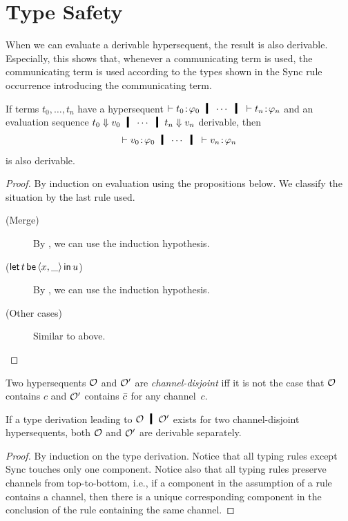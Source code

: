 \section{Type Safety}

When we can evaluate a derivable hypersequent,
the result is also derivable.
Especially, this shows that, whenever a communicating term is used,
the communicating term is used according to the types
shown in the Sync rule occurrence introducing the communicating term.

 \begin{theorem}
  \label{safety}
  If terms $t_0,\ldots,t_n$ have a hypersequent
   $\tr \tj{t_0}{\phi_0} \hmid \cdots \hmid \tr \tj{t_n}{\phi_n}$ and
  an evaluation sequence $t_0\eval v_0\hmid \cdots \hmid t_n\eval v_n$
  derivable, then
  \[
   \tr\tj{v_0}{\phi_0} \hmid \cdots \hmid \tr \tj{v_n}{\phi_n}
  \]
  is also derivable.
 \end{theorem}
 \begin{proof}
  By induction on evaluation using the propositions below.
  We classify the situation by the last rule used.
  \begin{description}
   \item[(Merge)]
	By , we can use the induction hypothesis.
   \item[($\mathsf{let }\,{t}\,\mathsf{ be }\,{\langle{x,\_}\rangle}\,\mathsf{ in }\,{u}$)]
	By , we can use the induction hypothesis.
   \item[(Other cases)]
	Similar to above.
  \end{description}
 \end{proof}

 Two hypersequents $\mathcal{O}$ and $\mathcal{O}'$ are
 \textit{channel-disjoint} iff
 it is not the case that $\mathcal{O}$ contains $c$ and $\mathcal{O}'$ contains
 $\bar{c}$ for any channel~$c$.
 \begin{proposition}[Split]
  \label{split}
  If a type derivation leading to $\hypert\hmid \hypert'$ exists for two
  channel-disjoint
  hypersequents,
  both $\mathcal{O}$ and $\mathcal{O}'$ are derivable separately.
 \end{proposition}
 \begin{proof}
  By induction on the type derivation.  Notice that all typing
  rules except Sync touches only one component.  Notice also that all
  typing rules preserve channels from top-to-bottom, i.e., if a
  component in the assumption of a rule contains a channel, then there
  is a unique corresponding component in the conclusion of the rule
  containing the same channel.
 \end{proof}


